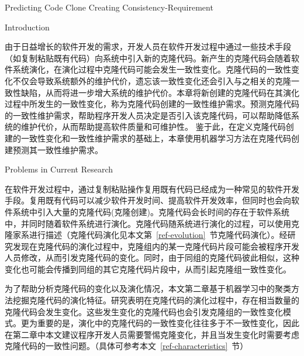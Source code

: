 
{Predicting Code Clone Creating Consistency-Requirement}

{Introduction}

由于日益增长的软件开发的需求，开发人员在软件开发过程中通过一些技术手段（如复制粘贴既有代码）向系统中引入新的克隆代码。新产生的克隆代码会随着软件系统演化，在演化过程中克隆代码可能会发生一致性变化。克隆代码的一致性变化不仅会导致系统额外的维护代价，遗忘该一致性变化还会引入与之相关的克隆一致性缺陷，从而将进一步增大系统的维护代价。本章将新创建的克隆代码在其演化过程中所发生的一致性变化，称为克隆代码创建的一致性维护需求。预测克隆代码的一致性维护需求，帮助程序开发人员决定是否引入该克隆代码，可以帮助降低系统的维护代价，从而帮助提高软件质量和可维护性。
鉴于此，在定义克隆代码创建的一致性变化和一致性维护需求的基础上，本章使用机器学习方法在克隆代码创建预测其一致性维护需求。%

{Problems in Current Research}

在软件开发过程中，通过复制粘贴操作复用既有代码已经成为一种常见的软件开发手段\cite{koschke2007survey}。复用既有代码可以减少软件开发时间、提高软件开发效率，但同时也会向软件系统中引入大量的克隆代码(克隆创建)。克隆代码会长时间的存在于软件系统中，并同时随着软件系统进行演化。克隆代码随系统进行演化的过程，可以使用克隆家系进行描述\cite{kim2005empirical}（克隆代码演化见本文第~\ref{ref-evolution}~节克隆代码演化）。经研究发现在克隆代码的演化过程中，克隆组内的某一克隆代码片段可能会被程序开发人员修改，从而引发克隆代码的变化。同时，由于同组的克隆代码彼此相似，这种变化也可能会传播到同组的其它克隆代码片段中，从而引起克隆组一致性变化\cite{saha2011automatic}。

为了帮助分析克隆代码的变化以及演化情况，本文第二章基于机器学习中的聚类方法挖掘克隆代码的演化特征。研究表明在克隆代码的演化过程中，存在相当数量的克隆代码会发生变化。这些发生变化的克隆代码也会引发克隆组的一致性变化模式。更为重要的是，演化中的克隆代码的一致性变化往往多于不一致性变化，因此在第二章中本文建议程序开发人员需要警惕克隆变化，并且当发生变化时需要考虑克隆代码的一致性问题。（具体可参考本文~\ref{ref-characteristics}~节）

